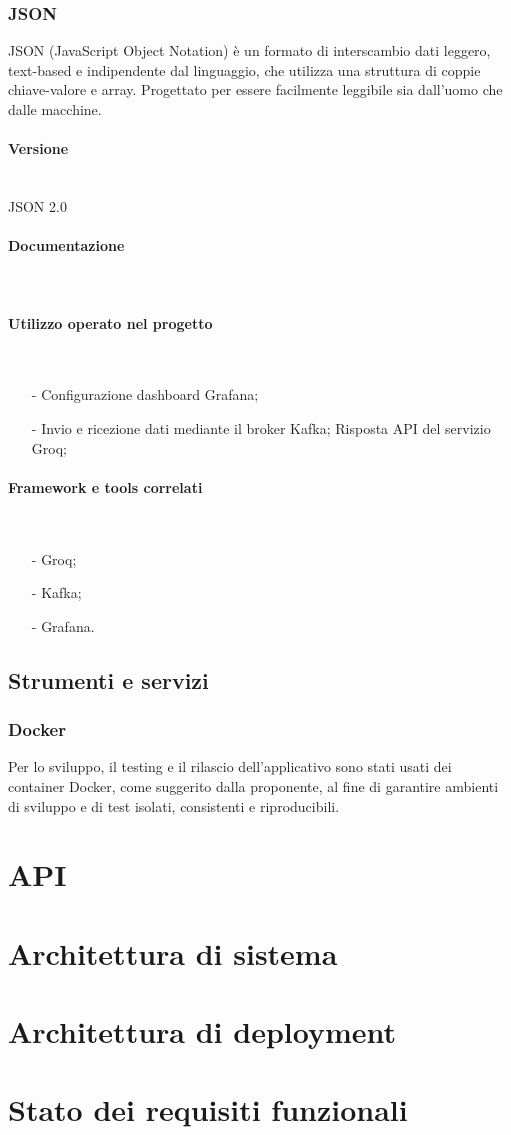 \documentclass[10pt]{article}
\newcommand{\myparagraph}[1]{\paragraph{#1}\mbox{}\\\vspace{0.4em}}
\begin{document}
\begin{justify}
        \subsubsection{JSON}
        JSON (JavaScript Object Notation) è un formato di interscambio dati leggero, text-based e indipendente dal linguaggio, che utilizza una struttura di coppie 
        chiave-valore e array. Progettato per essere facilmente leggibile sia dall'uomo che dalle macchine.
            \myparagraph{Versione} 
                JSON 2.0
            \myparagraph{Documentazione}
            \myparagraph{Utilizzo operato nel progetto}
                \begin{itemize}
                    \item[-] Configurazione dashboard Grafana;
                    \item[-] Invio e ricezione dati mediante il broker Kafka;
                    \ietm[-] Risposta API del servizio Groq;
                \end{itemize}
            \myparagraph{Framework e tools correlati}
                \begin{itemize}
                    \item[-] Groq;
                    \item[-] Kafka;
                    \item[-] Grafana.
                \end{itemize}


    \subsection{Strumenti e servizi}
        \subsubsection{Docker}
        Per lo sviluppo, il testing e il rilascio dell'applicativo sono stati usati dei container Docker, come suggerito dalla proponente, al fine di garantire ambienti di 
        sviluppo e di test isolati, consistenti e riproducibili.\\



\section{API}


\section{Architettura di sistema}


\section{Architettura di deployment}


\section{Stato dei requisiti funzionali}


\end{justify}
\end{document}
